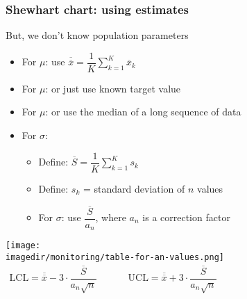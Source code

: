 \begin{frame}\frametitle{Shewhart chart: using estimates}
	
	But, we don't know population parameters
	\begin{itemize}
		\item	For $\mu$: use $\overline{\overline{x}} = \dfrac{1}{K} \displaystyle \sum_{k=1}^{K}{ \overline{x}_k}$ 
		\item	For $\mu$: or just use known target value 
		\item	For $\mu$: or use the median of a long sequence of data 
		\item	For $\sigma$: 
		\begin{itemize}
			\item	Define: $\overline{S} = \dfrac{1}{K} \displaystyle \sum_{k=1}^{K}{s_k}$ 
			\item	Define: $s_k$ = standard deviation of $n$ values 
			\item	For $\sigma$: use $\dfrac{\overline{S}}{a_n}$, where $a_n$ is a correction factor 
		\end{itemize}
	\end{itemize}
	
	\texttt{[image: \\imagedir/monitoring/table-for-an-values.png]}	
	$ 
	\begin{array}{rcccl}
		\text{LCL} = \overline{\overline{x}} - 3 \cdot \dfrac{\overline{S}}{a_n\sqrt{n}} && && \text{UCL} = \overline{\overline{x}} + 3 \cdot \dfrac{\overline{S}}{a_n\sqrt{n}} 
	\end{array}
	$
\end{frame}

